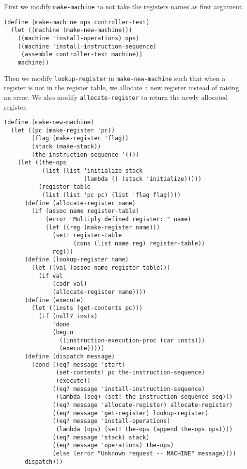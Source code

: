 \documentclass[a4paper,12pt]{article}
\begin{document}
First we modify \lstinline!make-machine! to not take the registers
names as first argument.

\begin{lstlisting}
(define (make-machine ops controller-text)
  (let ((machine (make-new-machine)))
    ((machine 'install-operations) ops)
    ((machine 'install-instruction-sequence)
     (assemble controller-text machine))
    machine))
\end{lstlisting}

Then we modify \lstinline!lookup-register! in
\lstinline!make-new-machine! such that when a register is not in the
register table, we allocate a new register instead of raising an
error.  We also modify \lstinline!allocate-register! to return the
newly allocated register.

\begin{lstlisting}
(define (make-new-machine)
  (let ((pc (make-register 'pc))
        (flag (make-register 'flag))
        (stack (make-stack))
        (the-instruction-sequence '()))
    (let ((the-ops
           (list (list 'initialize-stack
                       (lambda () (stack 'initialize)))))
          (register-table
           (list (list 'pc pc) (list 'flag flag))))
      (define (allocate-register name)
        (if (assoc name register-table)
            (error "Multiply defined register: " name)
            (let ((reg (make-register name)))
              (set! register-table
                    (cons (list name reg) register-table))
              reg)))
      (define (lookup-register name)
        (let ((val (assoc name register-table)))
          (if val
              (cadr val)
              (allocate-register name))))
      (define (execute)
        (let ((insts (get-contents pc)))
          (if (null? insts)
              'done
              (begin
                ((instruction-execution-proc (car insts)))
                (execute)))))
      (define (dispatch message)
        (cond ((eq? message 'start)
               (set-contents! pc the-instruction-sequence)
               (execute))
              ((eq? message 'install-instruction-sequence)
               (lambda (seq) (set! the-instruction-sequence seq)))
              ((eq? message 'allocate-register) allocate-register)
              ((eq? message 'get-register) lookup-register)
              ((eq? message 'install-operations)
               (lambda (ops) (set! the-ops (append the-ops ops))))
              ((eq? message 'stack) stack)
              ((eq? message 'operations) the-ops)
              (else (error "Unknown request -- MACHINE" message))))
      dispatch)))
\end{lstlisting}
\end{document}

